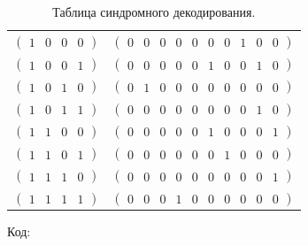 \documentclass{article}
\begin{document}
\begin{table}[h]
\begin{tabular}{c c}
        $\begin{pmatrix}1&0&0&0\end{pmatrix}$&$\begin{pmatrix}0&0&0&0&0&0&0&1&0&0\end{pmatrix}$\\
        $\begin{pmatrix}1&0&0&1\end{pmatrix}$&$\begin{pmatrix}0&0&0&0&0&1&0&0&1&0\end{pmatrix}$\\
        $\begin{pmatrix}1&0&1&0\end{pmatrix}$&$\begin{pmatrix}0&1&0&0&0&0&0&0&0&0\end{pmatrix}$\\
        $\begin{pmatrix}1&0&1&1\end{pmatrix}$&$\begin{pmatrix}0&0&0&0&0&0&0&0&1&0\end{pmatrix}$\\
        $\begin{pmatrix}1&1&0&0\end{pmatrix}$&$\begin{pmatrix}0&0&0&0&0&1&0&0&0&1\end{pmatrix}$\\
        $\begin{pmatrix}1&1&0&1\end{pmatrix}$&$\begin{pmatrix}0&0&0&0&0&0&1&0&0&0\end{pmatrix}$\\
        $\begin{pmatrix}1&1&1&0\end{pmatrix}$&$\begin{pmatrix}0&0&0&0&0&0&0&0&0&1\end{pmatrix}$\\
        $\begin{pmatrix}1&1&1&1\end{pmatrix}$&$\begin{pmatrix}0&0&0&1&0&0&0&0&0&0\end{pmatrix}$\\ \bottomrule
    \end{tabular}
    \caption{Таблица синдромного декодирования.}
\end{table}
Код:
\inputminted[linenos]{python}{../../code/ch2/syndec.py}
\end{document}
